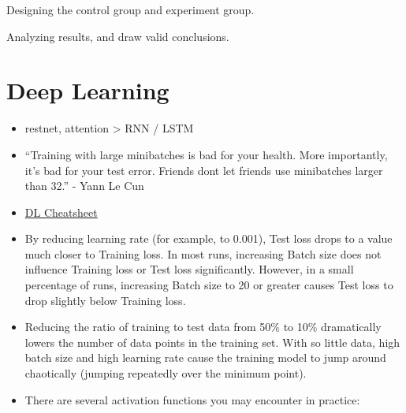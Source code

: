 \documentclass[]{book}
\theoremstyle{definition}
\theoremstyle{definition}
\theoremstyle{definition}
\theoremstyle{remark}
\begin{document}
Designing the control group and experiment group.

Analyzing results, and draw valid conclusions.

\chapter{Deep Learning}\label{deep-learning}

\begin{itemize}
\item
  restnet, attention \textgreater{} RNN / LSTM
\item
  ``Training with large minibatches is bad for your health. More
  importantly, it's bad for your test error. Friends dont let friends
  use minibatches larger than 32.'' - Yann Le Cun
\item
  \href{https://hackernoon.com/deep-learning-cheat-sheet-25421411e460}{DL
  Cheatsheet}
\item
  By reducing learning rate (for example, to 0.001), Test loss drops to
  a value much closer to Training loss. In most runs, increasing Batch
  size does not influence Training loss or Test loss significantly.
  However, in a small percentage of runs, increasing Batch size to 20 or
  greater causes Test loss to drop slightly below Training loss.
\item
  Reducing the ratio of training to test data from 50\% to 10\%
  dramatically lowers the number of data points in the training set.
  With so little data, high batch size and high learning rate cause the
  training model to jump around chaotically (jumping repeatedly over the
  minimum point).
\item
  There are several activation functions you may encounter in practice:


\end{itemize}
\end{document}
